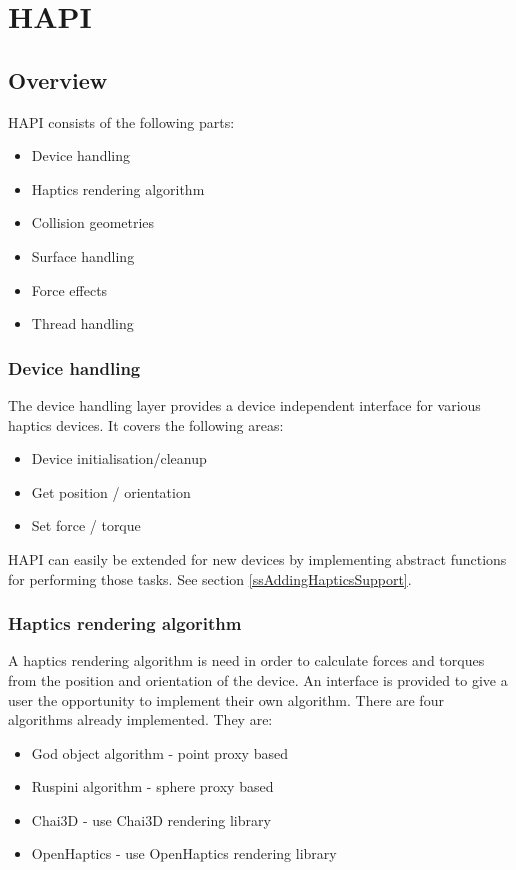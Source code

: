 
\chapter {HAPI}


\section{Overview}

HAPI consists of the following parts:

\begin{itemize}
\item Device handling
\item Haptics rendering algorithm
\item Collision geometries
\item Surface handling
\item Force effects
\item Thread handling
\end{itemize}


\subsection{Device handling}
The device handling layer provides a device independent
interface for various haptics devices. It covers the following
areas:

\begin{itemize}
\item Device initialisation/cleanup
\item Get position / orientation 
\item Set force / torque
\end{itemize}

HAPI can easily be extended for new devices by implementing abstract
functions for performing those tasks. See section \ref{ssAddingHapticsSupport}.

\subsection{Haptics rendering algorithm}
A haptics rendering algorithm is need in order to calculate forces and
torques from the position and orientation of the device. An interface
is provided to give a user the opportunity to implement their own
algorithm. There are four algorithms already implemented. They are:

\begin{itemize}
\item God object algorithm - point proxy based
\item Ruspini algorithm - sphere proxy based
\item Chai3D - use Chai3D rendering library
\item OpenHaptics - use OpenHaptics rendering library
\end{itemize}

